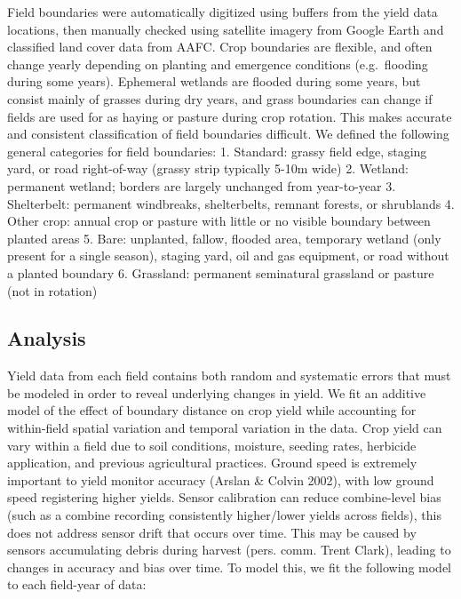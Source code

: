 \documentclass[]{elsarticle} %
\begin{document}
Field boundaries were automatically digitized using buffers from the yield data locations, then manually checked using satellite imagery from Google Earth and classified land cover data from AAFC.
Crop boundaries are flexible, and often change yearly depending on planting and emergence conditions (e.g.~flooding during some years).
Ephemeral wetlands are flooded during some years, but consist mainly of grasses during dry years, and grass boundaries can change if fields are used for as haying or pasture during crop rotation.
This makes accurate and consistent classification of field boundaries difficult.
We defined the following general categories for field boundaries:
1. Standard: grassy field edge, staging yard, or road right-of-way (grassy strip typically 5-10m wide)
2. Wetland: permanent wetland; borders are largely unchanged from year-to-year
3. Shelterbelt: permanent windbreaks, shelterbelts, remnant forests, or shrublands
4. Other crop: annual crop or pasture with little or no visible boundary between planted areas
5. Bare: unplanted, fallow, flooded area, temporary wetland (only present for a single season), staging yard, oil and gas equipment, or road without a planted boundary
6. Grassland: permanent seminatural grassland or pasture (not in rotation)

\hypertarget{analysis}{%
\subsection{Analysis}\label{analysis}}

Yield data from each field contains both random and systematic errors that must be modeled in order to reveal underlying changes in yield.
We fit an additive model of the effect of boundary distance on crop yield while accounting for within-field spatial variation and temporal variation in the data.
Crop yield can vary within a field due to soil conditions, moisture, seeding rates, herbicide application, and previous agricultural practices.
Ground speed is extremely important to yield monitor accuracy (Arslan \& Colvin 2002), with low ground speed registering higher yields.
Sensor calibration can reduce combine-level bias (such as a combine recording consistently higher/lower yields across fields), this does not address sensor drift that occurs over time.
This may be caused by sensors accumulating debris during harvest (pers. comm. Trent Clark), leading to changes in accuracy and bias over time.
To model this, we fit the following model to each field-year of data:
\end{document}
